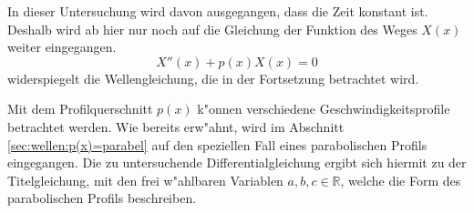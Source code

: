 In dieser Untersuchung wird davon ausgegangen, dass die Zeit konstant ist. 
Deshalb wird ab hier nur noch auf die Gleichung der Funktion des Weges $X(x)$
weiter eingegangen.
\begin{equation*}
	X''(x) + p(x) X(x) = 0
\end{equation*}
widerspiegelt die Wellengleichung, die in der Fortsetzung betrachtet wird.

Mit dem Profilquerschnitt $p(x)$ k"onnen verschiedene Geschwindigkeitsprofile 
betrachtet werden. Wie bereits erw"ahnt, wird im Abschnitt 
\ref{sec:wellen:p(x)=parabel} auf den speziellen Fall eines parabolischen 
Profils eingegangen. Die zu untersuchende Differentialgleichung ergibt sich 
hiermit zu der Titelgleichung, mit den frei w"ahlbaren Variablen ${a,b,c} \in 
\mathbb{R}$, welche die Form des parabolischen Profils beschreiben.